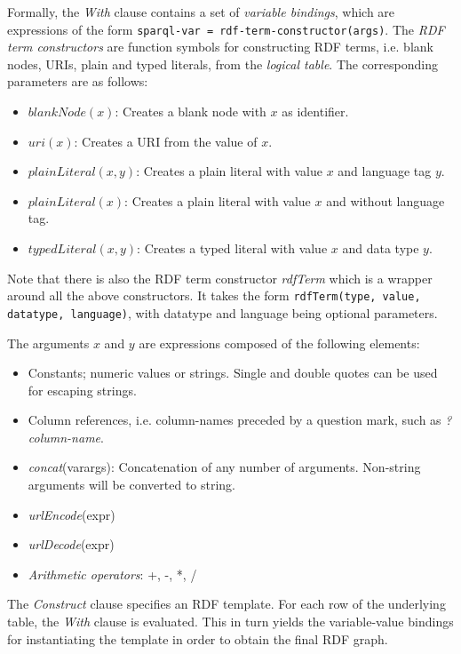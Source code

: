 \documentclass[a4paper,twoside,bibtotoc,abstracton,12pt,BCOR=15mm]{scrreprt}
\begin{document}
Formally, the \emph{With} clause contains a set of \emph{variable bindings}, which are expressions of the form \texttt{sparql-var = rdf-term-constructor(args)}.
The \emph{RDF term constructors} are function symbols for constructing RDF terms, i.e. blank nodes, URIs, plain and typed literals, from the \emph{logical table}.
The corresponding parameters are as follows:
\begin{itemize}
  \item $blankNode(x)$: Creates a blank node with $x$ as identifier.
  \item $uri(x)$:  Creates a URI from the value of $x$.
  \item $plainLiteral(x, y)$: Creates a plain literal with value $x$ and language tag $y$.
  \item $plainLiteral(x)$: Creates a plain literal with value $x$ and without language tag.
  \item $typedLiteral(x, y)$: Creates a typed literal with value $x$ and data type $y$. 
\end{itemize}
Note that there is also the RDF term constructor \emph{rdfTerm} which is a wrapper around all the above constructors.
It takes the form \texttt{rdfTerm(type, value, datatype, language)}, with datatype and language being optional parameters.

The arguments $x$ and $y$ are expressions composed of the following elements:
\begin{itemize}
           \item Constants; numeric values or strings.
           		Single and double quotes can be used for escaping strings. 
           \item Column references, i.e. column-names preceded by a question mark, such as \emph{?column-name}.
           \item \emph{concat}(varargs): Concatenation of any number of arguments. Non-string arguments will be converted to string.
           \item \emph{urlEncode}(expr)
           \item \emph{urlDecode}(expr)
           \item \emph{Arithmetic operators}: +, -, *, /
\end{itemize}
           
The \emph{Construct} clause specifies an RDF template. 
For each row of the underlying table, the \emph{With} clause is evaluated.
This in turn yields the variable-value bindings for instantiating the template in order to obtain the final RDF graph.
  
\end{document}
